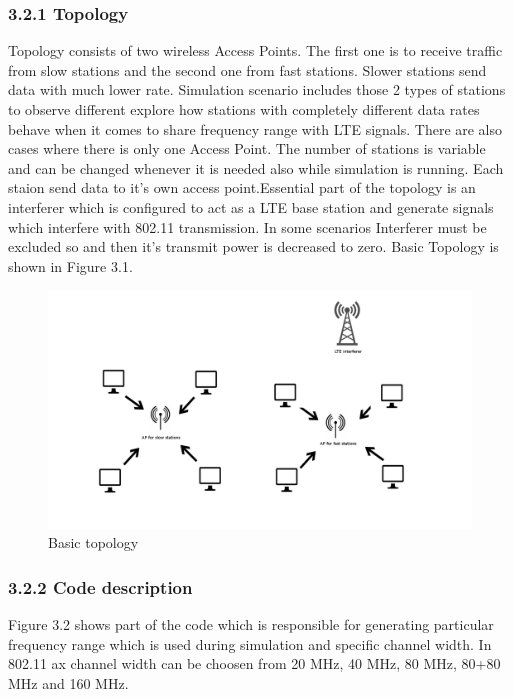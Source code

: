\subsubsection{\hspace*{0.5cm}3.2.1 Topology}
	\textnormal{\hspace*{0.5cm}Topology consists of two wireless Access Points. The first one is to receive traffic from slow stations and the second one from fast stations. Slower stations send data with much lower rate. Simulation scenario includes those 2 types of stations to observe different explore how stations with completely different data rates behave when it comes to share frequency range with LTE signals. There are also cases where there is  only one Access Point. The number of stations is variable and can be changed whenever it is needed also while simulation is running. Each staion send data to it's own access point.\newline\hspace*{1cm}Essential part of the topology is an interferer which is configured to act as a LTE base station and generate signals which interfere with 802.11 transmission. In some scenarios Interferer must be excluded so and then it's transmit power is decreased to zero. Basic Topology is shown in Figure 3.1. }
	\begin{figure}[h]

	\includegraphics[scale=0.25]{Images/topology}
	\caption{Basic topology}
	\end{figure}
	
\subsubsection{\hspace*{0.5cm}3.2.2 Code description}
\textnormal{\hspace*{0.5cm}Figure 3.2 shows part of the code which is responsible for generating particular frequency range which is used during simulation and specific channel width. In 802.11 ax channel width can be choosen from 20 MHz, 40 MHz, 80 MHz, 80+80 MHz and 160 MHz. }

